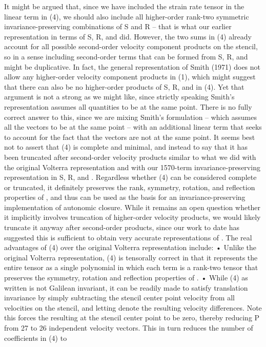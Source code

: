 It might be argued that, since we have included the strain rate tensor in the linear term in (4), we should also include all higher-order rank-two symmetric invariance-preserving combinations of S and R – that is what our earlier representation in terms of S, R,   and   did. However, the two sums in (4) already account for all possible second-order velocity component products on the stencil, so in a sense including second-order terms that can be formed from S, R,   and   might be duplicative. In fact, the general representation of Smith (1971) does not allow any higher-order velocity component products in (1), which might suggest that there can also be no higher-order products of S, R,   and   in (4). Yet that argument is not a strong as we might like, since strictly speaking Smith’s representation assumes all quantities to be at the same point.  There is no fully correct answer to this, since we are mixing Smith’s formulation – which assumes all the vectors to be at the same point – with an additional linear term that seeks to account for the fact that the vectors are not at the same point.  It seems best not to assert that (4) is complete and minimal, and instead to say that it has been truncated after second-order velocity products similar to what we did with the original Volterra representation and with our 1570-term invariance-preserving representation in S, R,   and  .
Regardless whether (4) can be considered complete or truncated, it definitely preserves the rank, symmetry, rotation, and reflection properties of  , and thus can be used as the basis for an invariance-preserving implementation of autonomic closure. While it remains an open question whether it implicitly involves truncation of higher-order velocity products, we would likely truncate it anyway after second-order products, since our work to date has suggested this is sufficient to obtain very accurate representations of  . The real advantages of (4) over the original Volterra representation include:
•	Unlike the original Volterra representation, (4) is tensorally correct in that it represents the entire tensor   as a single polynomial in which each term is a rank-two tensor that preserves the symmetry, rotation and reflection properties of  . 
•	While (4) as written is not Galilean invariant, it can be readily made to satisfy translation invariance by simply subtracting the stencil center point velocity from all velocities on the stencil, and letting   denote the resulting velocity differences.  Note this forces the resulting   at the stencil center point to be zero, thereby reducing P from 27 to 26 independent velocity vectors.  This in turn reduces the number of coefficients in (4) to 
